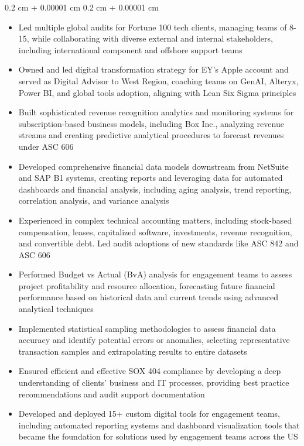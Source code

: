 \documentclass[10pt, letterpaper]{article}
\newenvironment{highlights}{
    \begin{itemize}[
        topsep=0.10 cm,
        parsep=0.10 cm,
        partopsep=0pt,
        itemsep=0pt,
        leftmargin=0.4 cm + 10pt
    ]
}{
    \end{itemize}
} %
\newenvironment{onecolentry}{
    \begin{adjustwidth}{
        0.2 cm + 0.00001 cm
    }{
        0.2 cm + 0.00001 cm
    }
}{
    \end{adjustwidth}
} %
\begin{document}
        \vspace{0.10 cm}
        \begin{onecolentry}
            \begin{highlights}
                \item Led multiple global audits for Fortune 100 tech clients, managing teams of 8-15, while collaborating with diverse external and internal stakeholders, including international component and offshore support teams
                \item Owned and led digital transformation strategy for EY's Apple account and served as Digital Advisor to West Region, coaching teams on GenAI, Alteryx, Power BI, and global tools adoption, aligning with Lean Six Sigma principles
                \item Built sophisticated revenue recognition analytics and monitoring systems for subscription-based business models, including Box Inc., analyzing revenue streams and creating predictive analytical procedures to forecast revenues under ASC 606
                \item Developed comprehensive financial data models downstream from NetSuite and SAP B1 systems, creating reports and leveraging data for automated dashboards and financial analysis, including aging analysis, trend reporting, correlation analysis, and variance analysis
                \item Experienced in complex technical accounting matters, including stock-based compensation, leases, capitalized software, investments, revenue recognition, and convertible debt. Led audit adoptions of new standards like ASC 842 and ASC 606
                \item Performed Budget vs Actual (BvA) analysis for engagement teams to assess project profitability and resource allocation, forecasting future financial performance based on historical data and current trends using advanced analytical techniques
                \item Implemented statistical sampling methodologies to assess financial data accuracy and identify potential errors or anomalies, selecting representative transaction samples and extrapolating results to entire datasets
                \item Ensured efficient and effective SOX 404 compliance by developing a deep understanding of clients' business and IT processes, providing best practice recommendations and audit support documentation
                \item Developed and deployed 15+ custom digital tools for engagement teams, including automated reporting systems and dashboard visualization tools that became the foundation for solutions used by engagement teams across the US

\end{highlights}
\end{onecolentry}
\end{document}
